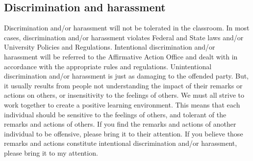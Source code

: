 \documentclass{article}
\begin{document}
\subsection{Discrimination and harassment}
Discrimination and/or harassment will not be tolerated in the classroom. In most cases, discrimination and/or harassment violates Federal and State laws and/or University Policies and Regulations. Intentional discrimination and/or harassment will be referred to the Aﬃrmative Action Oﬃce and dealt with in accordance with the appropriate rules and regulations. Unintentional discrimination and/or harassment is just as damaging to the oﬀended party. But, it usually results from people not understanding the impact of their remarks or actions on others, or insensitivity to the feelings of others. We must all strive to work together to create a positive learning environment. This means that each individual should be sensitive to the feelings of others, and tolerant of the remarks and actions of others. If you ﬁnd the remarks and actions of another individual to be oﬀensive, please bring it to their attention. If you believe those remarks and actions constitute intentional discrimination and/or harassment, please bring it to my attention.
\end{document}
